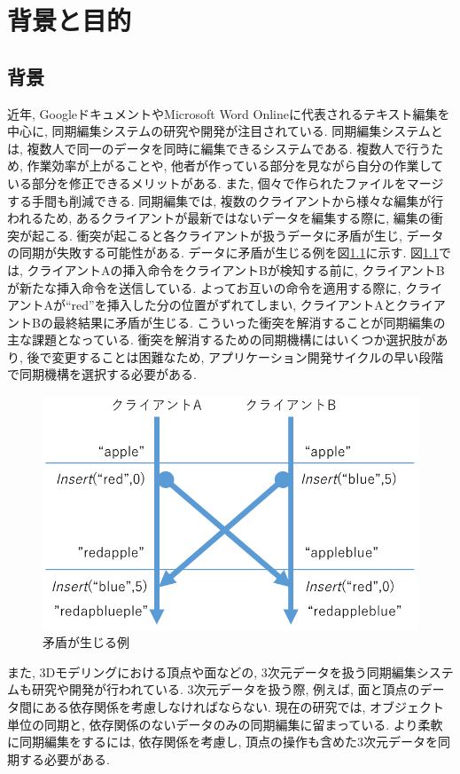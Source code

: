 \chapter{背景と目的}\label{chap:background}

\section{背景}
近年, GoogleドキュメントやMicrosoft Word Onlineに代表されるテキスト編集を中心に, 同期編集システムの研究や開発が注目されている. 同期編集システムとは, 複数人で同一のデータを同時に編集できるシステムである. 複数人で行うため, 作業効率が上がることや, 他者が作っている部分を見ながら自分の作業している部分を修正できるメリットがある. また, 個々で作られたファイルをマージする手間も削減できる. 同期編集では, 複数のクライアントから様々な編集が行われるため, あるクライアントが最新ではないデータを編集する際に, 編集の衝突が起こる. 衝突が起こると各クライアントが扱うデータに矛盾が生じ, データの同期が失敗する可能性がある. データに矛盾が生じる例を図\ref{mujyun}に示す. 図\ref{mujyun}では, クライアントAの挿入命令をクライアントBが検知する前に, クライアントBが新たな挿入命令を送信している. よってお互いの命令を適用する際に, クライアントAが``red''を挿入した分の位置がずれてしまい, クライアントAとクライアントBの最終結果に矛盾が生じる. こういった衝突を解消することが同期編集の主な課題となっている. 衝突を解消するための同期機構にはいくつか選択肢があり, 後で変更することは困難なため, アプリケーション開発サイクルの早い段階で同期機構を選択する必要がある.
\begin{figure}[]
  \begin{center}
    \includegraphics[scale=0.5]{images/mujyun}
    \caption{矛盾が生じる例}
    \label{mujyun}
  \end{center}
\end{figure}
\par
また, 3Dモデリングにおける頂点や面などの, 3次元データを扱う同期編集システムも研究や開発が行われている. 3次元データを扱う際, 例えば, 面と頂点のデータ間にある依存関係を考慮しなければならない. 現在の研究では, オブジェクト単位の同期と, 依存関係のないデータのみの同期編集に留まっている. より柔軟に同期編集をするには, 依存関係を考慮し, 頂点の操作も含めた3次元データを同期する必要がある.

